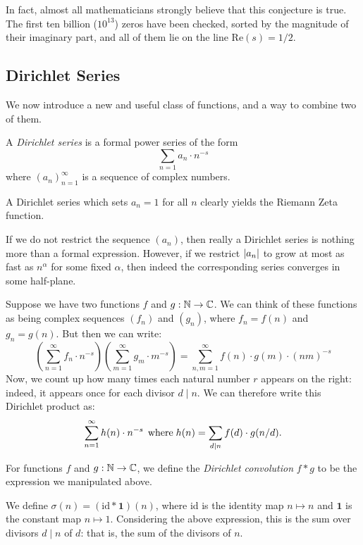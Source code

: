 \documentclass{article}
\begin{document}
\begin{note}
	In fact, almost all mathematicians strongly believe that this conjecture is true. The first ten billion ($10^{13}$) zeros have been checked, sorted by the magnitude of their imaginary part, and all of them lie on the line $\mathrm{Re}(s) = 1/2$.
\end{note}


\subsection{Dirichlet Series}
\label{subsection-distribution-of-primes-dirichlet-series}

We now introduce a new and useful class of functions, and a way to combine  two of them.

\begin{definition}
    A \textit{Dirichlet series} is a formal power series of the form
    \[
	\sum_{n = 1} a_n \cdot n^{-s}
	\]
	where $(a_n)_{n=1}^\infty$ is a sequence of complex numbers.
\end{definition}

\begin{note}
	A Dirichlet series which sets $a_n = 1$ for all $n$ clearly yields the Riemann Zeta function.
\end{note}

If we do not restrict the sequence $(a_n)$, then really a Dirichlet series is nothing more than a formal expression. However, if we restrict $\left\lvert a_n \right\rvert$ to grow at most as fast as $n^\alpha$ for some fixed $\alpha$, then indeed the corresponding series converges in some half-plane.

Suppose we have two functions $f$ and $g : \mathbb{N} \to \mathbb{C}$. We can think of these functions as being complex sequences $(f_n)$ and $(g_n)$, where $f_n = f(n)$ and $g_n = g(n)$. But then we can write:
\[
\left( \sum_{n=1}^\infty f_n \cdot n^{-s} \right)
\left( \sum_{m=1}^\infty g_m \cdot m^{-s} \right)
=
\sum_{n,m=1}^\infty f(n) \cdot g(m) \cdot (nm)^{-s}
\]
Now, we count up how many times each natural number $r$ appears on the right: indeed, it appears once for each divisor $d \mid n$. We can therefore write this Dirichlet product as:
\[
\sum_{n=1}^\infty h(n) \cdot n^{-s} \mathrel{\, \text{where}} h(n) = \sum_{d \mid n} f(d) \cdot g(n/d).
\]

\begin{definition}
    For functions $f$ and $g : \mathbb{N} \to \mathbb{C}$, we define the \textit{Dirichlet convolution} $f * g$ to be the expression we manipulated above.
    
    We define $\sigma(n) = (\mathrm{id} * \mathbf{1})(n)$, where id is the identity map $n \mapsto n$ and $\mathbf{1}$ is the constant map $n \mapsto 1$. Considering the above expression, this is the sum over divisors $d \mid n$ of $d$: that is, the sum of the divisors of $n$.
\end{definition}
\end{document}
